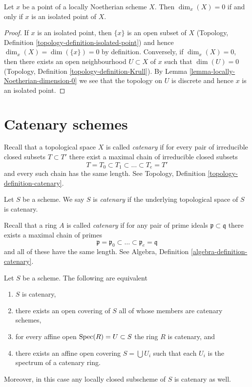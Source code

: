 \begin{lemma}
\label{lemma-isolated-dim-0-locally-noetherian}
Let $x$ be a point of a locally Noetherian scheme $X$.
Then $\dim_x(X) = 0$ if and only if $x$ is an isolated point of $X$.
\end{lemma}

\begin{proof}
If $x$ is an isolated point, then $\{x\}$ is an open subset of $X$
(Topology, Definition \ref{topology-definition-isolated-point})
and hence $\dim_x(X) = \dim(\{x\}) = 0$ by definition. Conversely, if
$\dim_x(X) = 0$, then there exists an open neighbourhood $U \subset X$
of $x$ such that $\dim(U) = 0$
(Topology, Definition \ref{topology-definition-Krull}).
By Lemma \ref{lemma-locally-Noetherian-dimension-0}
we see that the topology on $U$ is discrete and hence
$x$ is an isolated point.
\end{proof}





\section{Catenary schemes}
\label{section-catenary}

\noindent
Recall that a topological space $X$ is called {\it catenary} if
for every pair of irreducible closed subsets $T \subset T'$
there exist a maximal chain of irreducible closed subsets
$$
T = T_0 \subset T_1 \subset \ldots \subset T_e = T'
$$
and every such chain has the same length. See
Topology, Definition \ref{topology-definition-catenary}.

\begin{definition}
\label{definition-catenary}
Let $S$ be a scheme. We say $S$ is {\it catenary} if the
underlying topological space of $S$ is catenary.
\end{definition}

\noindent
Recall that a ring $A$ is called {\it catenary} if
for any pair of prime ideals $\mathfrak p \subset \mathfrak q$
there exists a maximal chain of primes
$$
\mathfrak p =
\mathfrak p_0 \subset \ldots \subset \mathfrak p_e
= \mathfrak q
$$
and all of these have the same length. See
Algebra, Definition \ref{algebra-definition-catenary}.

\begin{lemma}
\label{lemma-catenary-local}
Let $S$ be a scheme. The following are equivalent
\begin{enumerate}
\item $S$ is catenary,
\item there exists an open covering of $S$ all of whose members are
catenary schemes,
\item for every affine open $\mathop{\mathrm{Spec}}(R) = U \subset S$ the ring
$R$ is catenary, and
\item there exists an affine open covering $S = \bigcup U_i$ such
that each $U_i$ is the spectrum of a catenary ring.
\end{enumerate}
Moreover, in this case any locally closed subscheme of $S$ is catenary
as well.
\end{lemma}

